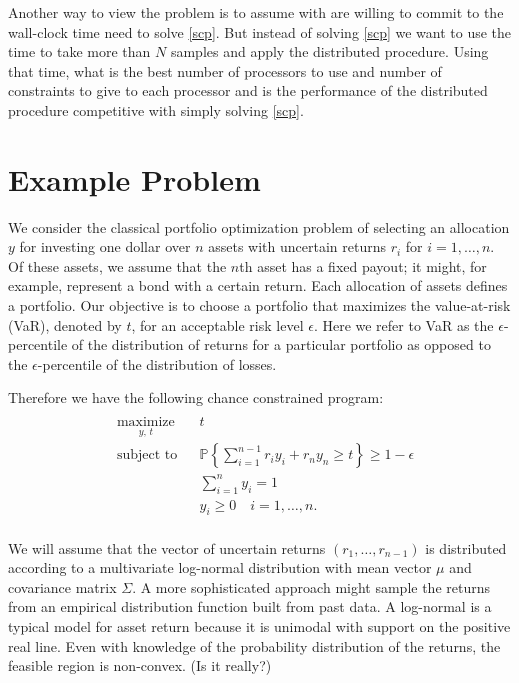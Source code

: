 \documentclass[12pt]{article}
\begin{document}
Another way to view the problem is to assume with are willing to commit to the wall-clock time need to solve \ref{scp}.
But instead of solving \ref{scp} we want to use the time to take more than $N$ samples and apply the distributed procedure.
Using that time, what is the best number of processors to use and number of constraints to give to each processor and is the performance of the distributed procedure competitive with simply solving \ref{scp}.

\section*{Example Problem}

We consider the classical portfolio optimization problem of selecting an allocation $y$ for investing one dollar over $n$ assets with uncertain returns $r_i$ for $i = 1, \ldots, n$.
Of these assets, we assume that the $n$th asset has a fixed payout; it might, for example, represent a bond with a certain return.
Each allocation of assets defines a portfolio.
Our objective is to choose a portfolio that maximizes the value-at-risk (VaR), denoted by $t$, for an acceptable risk level $\epsilon$.
Here we refer to VaR as the $\epsilon$-percentile of the distribution of returns for a particular portfolio as opposed to the $\epsilon$-percentile of the distribution of losses.

Therefore we have the following chance constrained program:
\begin{align}\label{Portfolioccp}
\begin{split}
\begin{aligned}
    & \underset{y, \,t}{\text{maximize}}
    & & t \\
    & \text{subject to}
    & & \mathbb{P}\left\{ \sum_{i=1}^{n-1} r_i y_i + r_n y_n \geq t \right\} \geq 1-\epsilon \\
    & & & \sum_{i=1}^n y_i = 1 \\
    & & & y_i \geq 0 \quad i = 1, \ldots, n.
\end{aligned}
\end{split} \tag{Portfolio CCP}
\end{align}

We will assume that the vector of uncertain returns $(r_1, \ldots, r_{n-1})$ is distributed according to a multivariate log-normal distribution with mean vector $\mu$ and covariance matrix $\Sigma$.
A more sophisticated approach might sample the returns from an empirical distribution function built from past data.
A log-normal is a typical model for asset return because it is unimodal with support on the positive real line.
Even with knowledge of the probability distribution of the returns, the feasible region is non-convex. (Is it really?)
\end{document}
